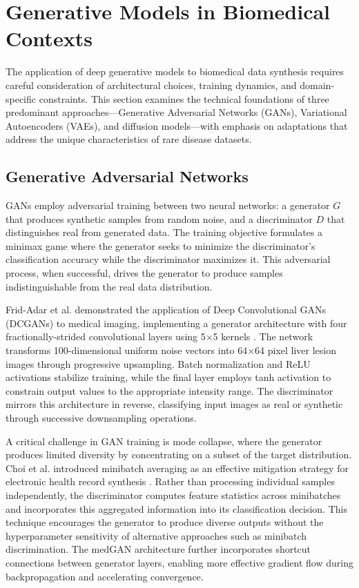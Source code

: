\section{Generative Models in Biomedical Contexts}
\label{sec:methods}

The application of deep generative models to biomedical data synthesis requires careful consideration of architectural choices, training dynamics, and domain-specific constraints. This section examines the technical foundations of three predominant approaches---Generative Adversarial Networks (GANs), Variational Autoencoders (VAEs), and diffusion models---with emphasis on adaptations that address the unique characteristics of rare disease datasets.

\subsection{Generative Adversarial Networks}

GANs employ adversarial training between two neural networks: a generator $G$ that produces synthetic samples from random noise, and a discriminator $D$ that distinguishes real from generated data. The training objective formulates a minimax game where the generator seeks to minimize the discriminator's classification accuracy while the discriminator maximizes it. This adversarial process, when successful, drives the generator to produce samples indistinguishable from the real data distribution.

Frid-Adar et al. demonstrated the application of Deep Convolutional GANs (DCGANs) to medical imaging, implementing a generator architecture with four fractionally-strided convolutional layers using 5×5 kernels \cite{fridadar2018gan}. The network transforms 100-dimensional uniform noise vectors into 64×64 pixel liver lesion images through progressive upsampling. Batch normalization and ReLU activations stabilize training, while the final layer employs tanh activation to constrain output values to the appropriate intensity range. The discriminator mirrors this architecture in reverse, classifying input images as real or synthetic through successive downsampling operations.

A critical challenge in GAN training is mode collapse, where the generator produces limited diversity by concentrating on a subset of the target distribution. Choi et al. introduced minibatch averaging as an effective mitigation strategy for electronic health record synthesis \cite{choi2017generating}. Rather than processing individual samples independently, the discriminator computes feature statistics across minibatches and incorporates this aggregated information into its classification decision. This technique encourages the generator to produce diverse outputs without the hyperparameter sensitivity of alternative approaches such as minibatch discrimination. The medGAN architecture further incorporates shortcut connections between generator layers, enabling more effective gradient flow during backpropagation and accelerating convergence.

